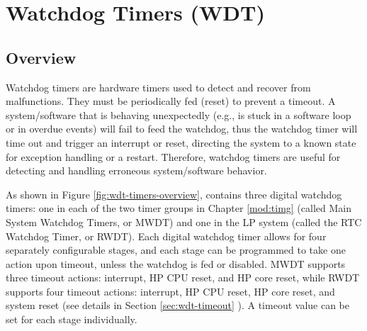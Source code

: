 \documentclass[main\_\_EN.tex]{subfiles}
\begin{document}

\ifglobal
\else
    {\let\clearpage\relax \listoftodos}
    {\let\clearpage\relax \listofdonetodos}
    \tableofcontents
\fi











\hypertarget{wdt}{}
\chapter{Watchdog Timers (WDT)}
\label{mod:wdt}

\section{Overview}

Watchdog timers are hardware timers used to detect and recover from malfunctions. They must be periodically fed (reset) to prevent a timeout. A system/software that is behaving unexpectedly (e.g., is stuck in a software loop or in overdue events) will fail to feed the watchdog, thus the watchdog timer will time out and trigger an interrupt or reset, directing the system to a known state for exception handling or a restart.  Therefore, watchdog timers are useful for detecting and handling erroneous system/software behavior.

As shown in Figure \ref{fig:wdt-timers-overview}, \chipname{} contains three digital watchdog timers: one in each of the two timer groups in Chapter \ref{mod:timg} \textit{} (called Main System Watchdog Timers, or MWDT) and one in the LP system (called the RTC Watchdog Timer, or RWDT). Each digital watchdog timer allows for four separately configurable stages, and each stage can be programmed to take one action upon timeout, unless the watchdog is fed or disabled. MWDT supports three timeout actions: interrupt, HP CPU reset, and HP core reset, while RWDT supports four timeout actions: interrupt, HP CPU reset, HP core reset, and system reset (see details in Section \ref{sec:wdt-timeout} \textit{}). A timeout value can be set for each stage individually.
\end{document}
